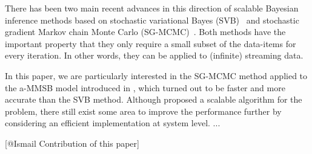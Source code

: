 There has been two main recent advances in this direction of scalable Bayesian inference methods based on stochastic variational Bayes (SVB)~\cite{hoffman2013stochastic,gopalan2013efficient,gopalan2012scalable} and stochastic gradient Markov chain Monte Carlo (SG-MCMC)~\cite{welling2011bayesian,patterson2013stochastic,ahn2014distributed}. Both methods have the important property that they only require a small subset of the data-items for every iteration. In other words, they can be applied to (infinite) streaming data. 

In this paper, we are particularly interested in the SG-MCMC method applied to the a-MMSB model introduced in \cite{LiAW15}, which turned out to be faster and more accurate than the SVB method. Although \cite{LiAW15} proposed a scalable algorithm for the problem, there still exist some area to improve the performance further by considering an efficient implementation at system level. ...

[@Ismail Contribution of this paper]






